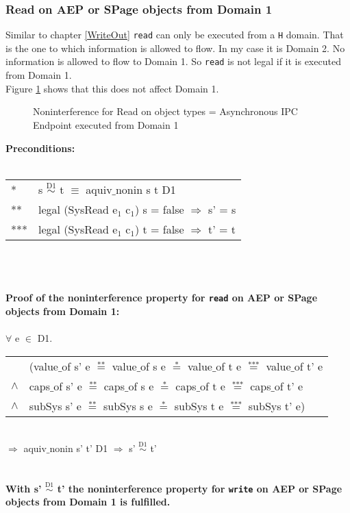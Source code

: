 \subsubsection{Read on AEP or SPage objects from Domain 1}
Similar to chapter \ref{WriteOut} \texttt{read} can only be executed from a \texttt{H} domain. That is the one to which information is allowed to flow. In my case it is Domain 2. No information is allowed to flow to Domain 1. So \texttt{read} is not legal if it is executed from Domain 1.\\
Figure \ref{fig:ReadOut} shows that this does not affect Domain 1. 
\begin{flushleft}
\begin{figure}[H]
\caption{Noninterference for Read on object types = Asynchronous IPC Endpoint executed from Domain 1}
\label{fig:ReadOut}
\end{figure}
\end{flushleft} 
\textbf{Preconditions:} \\ \\
\begin{tabular}{ll}
* & s $\overset{\text{D1}}{\sim}$ t $\equiv$ aquiv$\_$nonin s t D1	\\ 
** & legal (SysRead e$_1$ c$_1$) s = false $\Rightarrow$ s' = s \\ 
*** & legal (SysRead e$_1$ c$_1$) t = false $\Rightarrow$ t' = t
\end{tabular} \\ \\ \\
\textbf{Proof of the noninterference property for \texttt{read} on AEP or SPage objects from Domain 1:}\\ \\
$\forall$ e $\in$ D1. \\ 
\begin{tabular}{ll}
& (value$\_$of s' e $\overset{\text{**}}{=}$ value$\_$of s e $\overset{\text{*}}{=}$ value$\_$of t e $\overset{\text{***}}{=}$ value$\_$of t' e \\
$\wedge$ & caps$\_$of s' e $\overset{\text{**}}{=}$ caps$\_$of s e $\overset{\text{*}}{=}$ caps$\_$of t e $\overset{\text{***}}{=}$ caps$\_$of t' e \\
$\wedge$ & subSys s' e $\overset{\text{**}}{=}$ subSys s e $\overset{\text{*}}{=}$ subSys t e $\overset{\text{***}}{=}$ subSys t' e)
\end{tabular} \\
$\Rightarrow$ aquiv$\_$nonin s' t' D1 $\Rightarrow$ s' $\overset{\text{D1}}{\sim}$ t' \\ \\ \\
\textbf{With s' $\overset{\text{D1}}{\sim}$ t' the noninterference property for \texttt{write} on AEP or SPage objects from Domain 1 is fulfilled.}  
\clearpage

